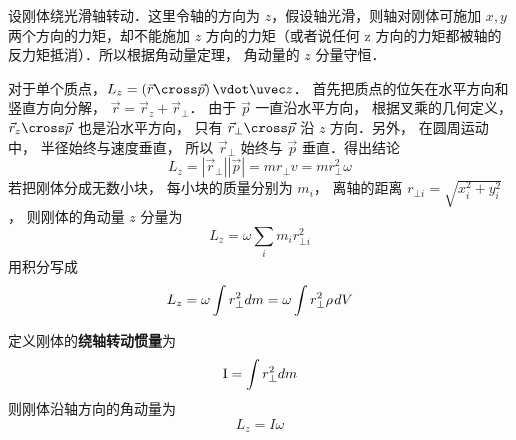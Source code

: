

设刚体绕光滑轴转动．这里令轴的方向为 $z$，假设轴光滑，则轴对刚体可施加 $x, y$ 两个方向的力矩，却不能施加 $z$ 方向的力矩（或者说任何 z 方向的力矩都被轴的反力矩抵消）．所以根据角动量定理， 角动量的 $z$ 分量守恒．

对于单个质点，${L_z} = \left( {\vec r \cross \vec p} \right) \vdot \uvec z$． 首先把质点的位矢在水平方向和竖直方向分解， $\vec r = {\vec r_z} + {\vec r_ \bot }$． 由于 $\vec p$ 一直沿水平方向， 根据叉乘的几何定义， ${\vec r_z} \cross \vec p$ 也是沿水平方向， 只有 ${\vec r_ \bot } \cross \vec p$ 沿 $z$ 方向．另外， 在圆周运动中， 半径始终与速度垂直， 所以 ${\vec r_ \bot }$ 始终与 $\vec p$ 垂直．得出结论
\begin{equation}
{L_z} = \left| {{{\vec r}_ \bot }} \right|\left| {\vec p} \right| = m{r_ \bot }v = mr_ \bot ^2\omega 
\end{equation}
若把刚体分成无数小块， 每小块的质量分别为 $m_i$， 离轴的距离 ${r_{ \bot i}} = \sqrt {x_i^2 + y_i^2} $， 则刚体的角动量 $z$ 分量为
\begin{equation}
{L_z} = \omega \sum\limits_i {{m_i}r_{ \bot i}^2} 
\end{equation}
用积分写成
\begin{equation}
{L_z} = \omega \int {r_ \bot ^2dm} = \omega \int {r_ \bot ^2\rho {\kern 1pt} dV} 
\end{equation}

定义刚体的\textbf{绕轴转动惯量}为
\begin{equation}
{\rm{I}} = \int {r_ \bot ^2dm} 
\end{equation}
则刚体沿轴方向的角动量为
\begin{equation}
{L_z} = I\omega 
\end{equation}
 

